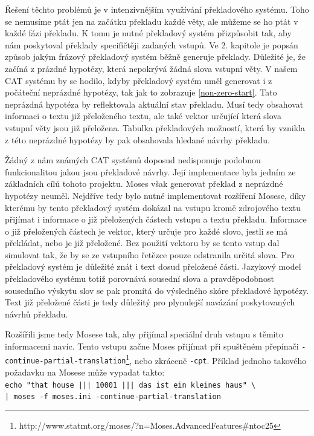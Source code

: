 \documentclass[12pt,a4paper]{report}
\begin{document}
Řešení těchto problémů je v intenzivnějším využívání překladového systému. Toho se nemusíme ptát jen na začátku překladu každé věty, ale můžeme se ho ptát v každé fázi překladu. K tomu je nutné překladový systém přizpůsobit tak, aby nám poskytoval překlady specifičtěji zadaných vstupů. Ve 2. kapitole je popsán způsob jakým frázový překladový systém běžně generuje překlady. Důležité je, že začíná z prázdné hypotézy, která nepokrývá žádná slova vstupní věty. V našem CAT systému by se hodilo, kdyby překladový systém uměl generovat i z počáteční neprázdné hypotézy, tak jak to zobrazuje \ref{non-zero-start}. Tato neprázdná hypotéza by reflektovala aktuální stav překladu. Musí tedy obsahovat informaci o textu již přeloženého textu, ale také vektor určující která slova vstupní věty jsou již přeložena. Tabulka překladových možností, která by vznikla z této neprázdné hypotézy by pak obsahovala hledané návrhy překladu.

Žádný z nám známých CAT systémů doposud nedisponuje podobnou funkcionalitou jakou jsou překladové návrhy. Její implementace byla jedním ze základních cílů tohoto projektu. Moses však generovat překlad z neprázdné hypotézy neuměl. Nejdříve tedy bylo nutné implementovat rozšíření Mosese, díky kterému by tento překladový systém dokázal na vstupu kromě zdrojového textu přijímat i informace o již přeložených částech vstupu a textu překladu. Informace o již přeložených částech je vektor, který určuje pro každé slovo, jestli se má překládat, nebo je již přeložené. Bez použití vektoru by se tento vstup dal simulovat tak, že by se ze vstupního řetězce pouze odstranila určitá slova. Pro překladový systém je důležité znát i text dosud přeložené části. Jazykový model překladového systému totiž porovnává sousední slova a pravděpodobnost sousedního výskytu slov se pak promítá do výsledného skóre překladové hypotézy. Text již přeložené části je tedy důležitý pro plynulejší navázání poskytovaných návrhů překladu.

Rozšířili jsme tedy Mosese tak, aby přijímal speciální druh vstupu s těmito informacemi navíc. Tento vstupu začne Moses přijímat při spuštěném přepínači {\tt -continue-partial-translation}\footnote{http://www.statmt.org/moses/?n=Moses.AdvancedFeatures\#ntoc25}, nebo zkráceně {\tt -cpt}. Příklad jednoho takového požadavku na Mosese může vypadat takto:\\

{\tt echo "that house ||| 10001 ||| das ist ein kleines haus" \textbackslash \\ | moses -f moses.ini -continue-partial-translation } \\
\end{document}
